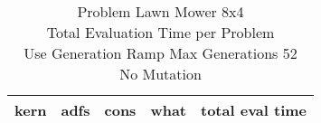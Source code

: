 \begin{table}[H]
\caption{Problem  Lawn Mower 8x4\\Total Evaluation Time per Problem \\ Use Generation Ramp  Max Generations 52\\ No Mutation \\}
\begin{center}
\scalebox{1.0} %
{
\begin{tabular}{llllr}
\hline
kern & adfs & cons & what & total eval time \\
\hline


\end{tabular}
}
\end{center}
\end{table}

